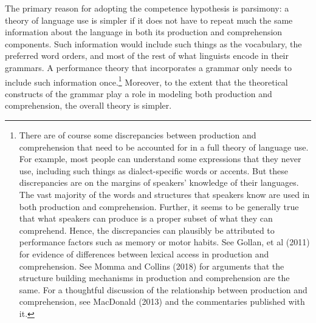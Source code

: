 \documentclass[a4paper]{article}
\begin{document}
The primary reason for adopting the competence hypothesis is parsimony:  a theory of language use is simpler if it does not have to repeat much the same information about the language in both its production and comprehension components.  Such information would include such things as the vocabulary, the preferred word orders, and most of the rest of what linguists encode in their grammars.  A performance theory that incorporates a grammar only needs to include such information once.\footnote{There are of course some discrepancies between production and comprehension that need to be accounted for in a full theory of language use.  For example, most people can understand some expressions that they never use, including such things as dialect-specific words or accents.  But these discrepancies are on the margins of speakers' knowledge of their languages.  The vast majority of the words and structures that speakers know are used in both production and comprehension.  Further, it seems to be generally true that what speakers can produce is a proper subset of what they can comprehend.  Hence, the discrepancies can plausibly be attributed to performance factors such as memory or motor habits.  See Gollan, et al (2011) for evidence of differences between lexical access in production and comprehension.  See Momma and Collins (2018) for arguments that the structure building mechanisms in production and comprehension are the same.  For a thoughtful discussion of the relationship between production and comprehension, see MacDonald (2013) and the commentaries published with it.}  Moreover, to the extent that the theoretical constructs of the grammar play a role in modeling both production and comprehension, the overall theory is simpler.
\end{document}
